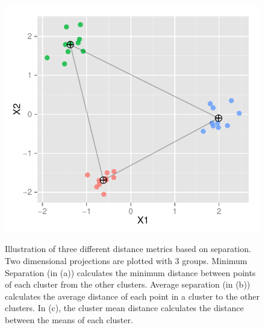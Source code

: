 \documentclass[12]{article}
\begin{document}
\begin{figure}[hbtp]
{\includegraphics[scale=0.45]{mean-sep-example.pdf}
\label{type_2}
}
	\vspace{-.1in}
\caption{Illustration of three different distance metrics based on separation. Two dimensional projections are plotted with 3 groups. Minimum Separation (in (a)) calculates the minimum distance between points of each cluster from the other clusters. Average separation (in (b)) calculates the average distance of each point  in a cluster to the other clusters. In (c), the cluster mean distance calculates the distance between the means of each cluster. }
\label{sep-dist}
\end{figure}
\end{document}
